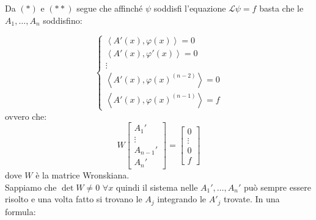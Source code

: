 \documentclass[a4paper,11pt,titlepage]{book}
\begin{document}
Da $(*)$ e $(**)$ segue che affinché $\psi$ soddisfi l'equazione $\mathcal{L}\psi=f$ basta che le $A_1,\ldots,A_n$ soddisfino:

$$\begin{cases}
\left\langle A'(x),\varphi(x)\right\rangle=0\\
\left\langle A'(x),\varphi'(x)\right\rangle=0\\
\vdots\\
\left\langle A'(x),\varphi(x)^{(n-2)}\right\rangle=0\\
\left\langle A'(x),\varphi(x)^{(n-1)}\right\rangle=f
\end{cases}$$
ovvero che:
$$W\begin{bmatrix}
A_1'\\
\vdots\\
A_{n-1}'\\
A_n'
\end{bmatrix} = \begin{bmatrix}
0\\ \vdots \\ 0 \\ f
\end{bmatrix}$$
dove $W$ è la matrice Wronskiana.\\

Sappiamo che $\det W\ne 0$ $\forall x$ quindi il sistema nelle $A_1',\ldots,A_n'$ può sempre essere risolto e una volta fatto si trovano le $A_j$ integrando le $A'_j$ trovate. In una formula:
\end{document}
